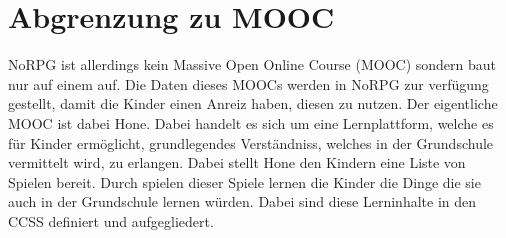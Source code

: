 \section{Abgrenzung zu MOOC}

NoRPG ist allerdings kein Massive Open Online Course (MOOC) sondern baut nur auf einem auf. Die Daten dieses MOOCs werden in NoRPG zur verfügung gestellt, damit die Kinder einen Anreiz haben, diesen zu nutzen. Der eigentliche MOOC ist dabei Hone. Dabei handelt es sich um eine Lernplattform, welche es für Kinder ermöglicht, grundlegendes Verständniss, welches in der Grundschule vermittelt wird, zu erlangen. Dabei stellt Hone den Kindern eine Liste von Spielen bereit. Durch spielen dieser Spiele lernen die Kinder die Dinge die sie auch in der Grundschule lernen würden. Dabei sind diese Lerninhalte in den CCSS definiert und aufgegliedert.
